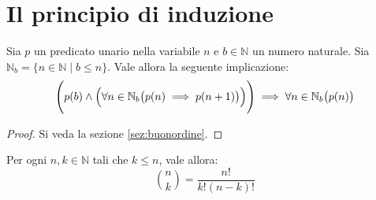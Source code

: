 \section{Il principio di induzione}\label{sez:induzione}

\begin{propbox}
	Sia $p$ un predicato unario nella variabile $n$ e $b \in \mathbb{N}$ un numero naturale. Sia $\mathbb{N}_{b}=\{n \in \mathbb{N} \; | \; b \leq n \}$. Vale allora la seguente implicazione:
	\begin{equation}
		\Biggl(p(b) \land \Bigl(\forall n \in \mathbb{N}_{b}\bigl(p(n)\implies p(n+1) \bigr)\Bigr)\Biggr) \implies \forall n \in \mathbb{N}_{b} \bigl(p(n)\bigr)
	\end{equation}
	
\end{propbox}

\begin{proof}
	Si veda la sezione \ref{sez:buonordine}. 
\end{proof}

\begin{teorbox}
	Per ogni $n,k \in \mathbb{N}$ tali che $k \leq n$, vale allora:
	\begin{equation}
		\binom{n}{k} = \frac{n!}{k!(n-k)!}
	\end{equation}
\end{teorbox}

